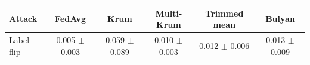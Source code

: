 \begin{tabular}{lccccc}
\toprule
Attack & FedAvg & Krum & Multi-Krum & Trimmed mean & Bulyan \\
\midrule
Label flip & 0.005 $\pm$ 0.003 & 0.059 $\pm$ 0.089 & 0.010 $\pm$ 0.003 & 0.012 $\pm$ 0.006 & 0.013 $\pm$ 0.009 \\
\bottomrule
\end{tabular}
